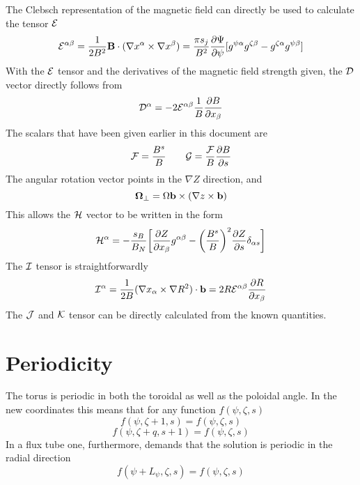 The Clebsch representation of the magnetic field can directly be used to calculate the tensor ${\cal E}$ 
\begin{equation} 
{\cal E}^{\alpha \beta} = {1 \over 2 B^2 }{\bf B} \cdot ( \nabla x^\alpha \times \nabla x^\beta )  =
{\pi s_j \over B^2} {\partial \Psi \over \partial \psi} [ g^{\psi \alpha} g^{\zeta \beta} - g^{\zeta \alpha} g^{\psi \beta} ] 
\end{equation} 
With the ${\cal E}$ tensor and the derivatives of the magnetic field strength given, the ${\cal D}$ vector 
directly follows from 
\begin{equation} 
{\cal D}^\alpha = - 2 {\cal E}^{\alpha \beta} {1 \over B} {\partial B \over \partial x_\beta} 
\end{equation}
The scalars that have been given earlier in this document are 
\begin{equation} 
{\cal F} = {B^s \over B} \qquad {\cal G} = {{\cal F} \over B} {\partial B \over \partial s} 
\end{equation}
The angular rotation vector points in the $\nabla Z$ direction, and 
\begin{equation} 
{\bf \Omega}_\perp = \Omega {\bf b} \times (\nabla z \times {\bf b} ) 
\end{equation} 
This allows the ${\cal H}$ vector to be written in the form 
\begin{equation} 
{\cal H^\alpha} = - \frac{s_B}{B_N} \biggl [ {\partial Z \over \partial x_\beta } g^{\alpha \beta} - 
\biggl ( {B^s \over B} \biggr )^2 {\partial Z \over \partial s} \delta_{\alpha s} \biggr ] 
\end{equation}
The ${\cal I}$ tensor is straightforwardly 
\begin{equation} 
{\cal I}^\alpha = {1 \over 2 B} (\nabla x_\alpha \times \nabla R^2 ) \cdot {\bf b} = 2 R {\cal E}^{\alpha \beta} 
{\partial R \over \partial x_\beta} 
\end{equation}
The ${\cal J}$ and ${\cal K}$ tensor can be directly calculated from the known quantities. 

\section{Periodicity} 

The torus is periodic in both the toroidal as well as the poloidal angle. In the new coordinates
this means that for any function $f(\psi,\zeta,s)$ 
\begin{equation} 
f(\psi,\zeta+1,s) = f(\psi,\zeta,s)
\label{toroidalperiodic}
\end{equation}
\begin{equation}
f(\psi,\zeta+q,s+1) = f(\psi,\zeta,s) 
\label{poloidalperiodic}
\end{equation}
In a flux tube one, furthermore, demands that the solution is periodic in the radial direction
\begin{equation} 
f(\psi + L_\psi,\zeta,s) = f(\psi,\zeta,s) 
\label{radialperiodic}
\end{equation}

